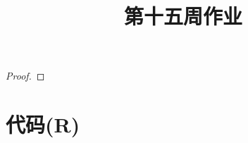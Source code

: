 \documentclass[cn]{homework}
\title{第十五周作业}
\begin{document}
    \maketitle

    \problem

    \problem
    \begin{subproblem}[(\alph*)]
        \item
        \begin{proof}

        \end{proof}
    \end{subproblem}

    \appendix
    \section{代码(R)}
    
\end{document}
